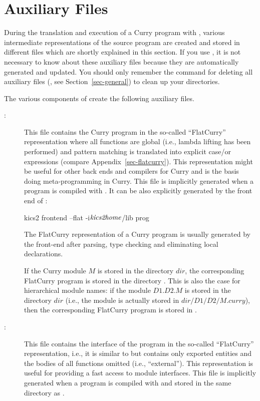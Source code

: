 \section{Auxiliary Files}
\label{sec-auxfiles}

During the translation and execution of a Curry program with \CYS,
various intermediate representations of the source program are created
and stored in different files which are shortly explained in this section.
If you use \CYS, it is not necessary to know about
these auxiliary files because they are automatically generated
and updated. You should only remember the command for deleting
all auxiliary files (, see Section~\ref{sec-general})
to clean up your directories.

The various components of \CYS create the following auxiliary files.
\begin{description}
\item[:] This file contains the Curry program
in the so-called ``FlatCurry'' representation where all functions are global
(i.e., lambda lifting has been performed) and pattern matching
is translated into explicit case/or expressions
(compare Appendix~\ref{sec-flatcurry}).
This representation might be useful for other back ends and
compilers for Curry and is the basis doing meta-programming in Curry.
This file is implicitly
generated when a program is compiled with \CYS.
It can be also explicitly generated by the
front end of \CYS:
\begin{curry}
kics2 frontend --flat -i$\mbox{\textit{kics2home}}$/lib prog
\end{curry}
The FlatCurry representation of a Curry program is usually
generated by the front-end after parsing, type checking and eliminating
local declarations.

If the Curry module $M$ is stored in the directory $dir$,
the corresponding FlatCurry program is stored in the directory
.
This is also the case for hierarchical module names:
if the module $D1.D2.M$ is stored in the directory $dir$
(i.e., the module is actually stored in $dir/D1/D2/M.curry$),
then the corresponding FlatCurry program is stored in
.

\item[:] This file contains the interface
of the program in the so-called ``FlatCurry'' representation,
i.e., it is similar to  but contains only exported
entities and the bodies of all functions omitted (i.e., ``external'').
This representation is useful for providing a fast access
to module interfaces.
This file is implicitly generated when a program is compiled with \CYS
and stored in the same directory as .


\end{description}
